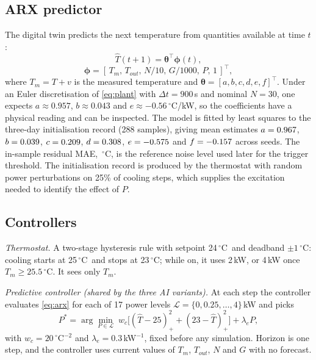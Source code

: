 \documentclass[conference]{IEEEtran}
\newcommand{\degC}{\ensuremath{^{\circ}}C}
\newcommand{\that}{\hat{T}}
\begin{document}
\subsection{ARX predictor}\label{sec:arx}
The digital twin predicts the next temperature from quantities available at time $t$:
\begin{equation}
\that(t{+}1)=\boldsymbol{\theta}^{\top}\boldsymbol{\phi}(t),
\label{eq:arx}
\end{equation}
\begin{equation}
\boldsymbol{\phi}=[\,T_{m},\,T_{out},\,N/10,\,G/1000,\,P,\,1\,]^{\top},
\end{equation}
where $T_m=T+v$ is the measured temperature and $\boldsymbol{\theta}=[a,b,c,d,e,f]^{\top}$. Under an Euler discretisation of \eqref{eq:plant} with $\Delta t=900$\,s and nominal $N=30$, one expects $a\approx0.957$, $b\approx0.043$ and $e\approx-0.56$\,\degC/kW, so the coefficients have a physical reading and can be inspected. The model is fitted by least squares to the three-day initialisation record (288 samples), giving mean estimates $a=0.967$, $b=0.039$, $c=0.209$, $d=0.308$, $e=-0.575$ and $f=-0.157$ across seeds. The in-sample residual MAE, \MaeRef\,\degC, is the reference noise level used later for the trigger threshold. The initialisation record is produced by the thermostat with random power perturbations on 25\% of cooling steps, which supplies the excitation needed to identify the effect of $P$.

\subsection{Controllers}\label{sec:controllers}
\emph{Thermostat.} A two-stage hysteresis rule with setpoint 24\,\degC\ and deadband $\pm1$\,\degC: cooling starts at 25\,\degC\ and stops at 23\,\degC; while on, it uses 2\,kW, or 4\,kW once $T_m\ge25.5$\,\degC. It sees only $T_m$.

\emph{Predictive controller (shared by the three AI variants).} At each step the controller evaluates \eqref{eq:arx} for each of 17 power levels $\mathcal{L}=\{0,0.25,\dots,4\}$\,kW and picks
\begin{equation}
P^{*}=\arg\min_{P\in\mathcal{L}}\; w_c\big[(\that-25)_+^{2}+(23-\that)_+^{2}\big]+\lambda_e P,
\label{eq:cost}
\end{equation}
with $w_c=20$\,\degC$^{-2}$ and $\lambda_e=0.3$\,kW$^{-1}$, fixed before any simulation. Horizon is one step, and the controller uses current values of $T_m$, $T_{out}$, $N$ and $G$ with no forecast.
\end{document}
